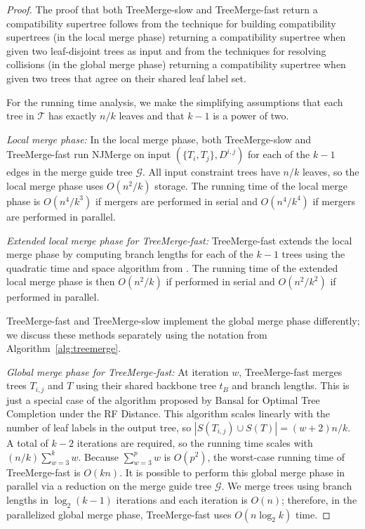 \begin{proof}
The proof that both TreeMerge-slow and TreeMerge-fast return a compatibility supertree follows from the technique for building compatibility supertrees (in the local merge phase) returning a compatibility supertree when given two leaf-disjoint trees as input and from the techniques for resolving collisions (in the global merge phase) returning a compatibility supertree when given two trees that \gls{agree} on their shared leaf label set.

For the running time analysis, we make the simplifying assumptions that each tree in $\mathcal{T}$ has exactly $n/k$ leaves and that $k-1$ is a power of two.

\emph{Local merge phase:} 
In the local merge phase, both TreeMerge-slow and TreeMerge-fast run NJMerge on input $(\{T_i, T_j\}, D^{i,j})$ for each of the $k-1$ edges in the merge guide tree $\mathcal{G}$.
All input constraint trees have $n/k$ leaves, so the local merge phase uses $O(n^2/k)$ storage.
The running time of the local merge phase is $O(n^4/k^3)$ if mergers are performed in serial and $O(n^4/k^4)$ if mergers are performed in parallel.

\emph{Extended local merge phase for TreeMerge-fast:}
TreeMerge-fast extends the local merge phase by computing branch lengths for each of the $k-1$ trees using the quadratic time and space algorithm from \cite{bryant1998rapid}. 
The running time of the extended local merge phase is then $O(n^2/k)$ if performed in serial and $O(n^2/k^2)$ if performed in parallel.

TreeMerge-fast and TreeMerge-slow implement the global merge phase differently; we discuss these methods separately using the notation from Algorithm~\ref{alg:treemerge}.

\emph{Global merge phase for TreeMerge-fast:}
At iteration $w$, TreeMerge-fast merges trees $T_{i,j}$ and $T$ using their shared backbone tree $t_B$ and branch lengths.
This is just a special case of the algorithm proposed by Bansal \cite{bansal2018linear} for Optimal Tree Completion under the \gls{RF} Distance.
This algorithm scales linearly with the number of leaf labels in the output tree, so $|S(T_{i,j}) \cup S(T)| = (w+2)n/k$.
A total of $k-2$ iterations are required, so the running time scales with $(n/k) \sum_{w=3}^k w$.
Because $\sum_{w=3}^p w$ is $O(p^2)$, the worst-case running time of TreeMerge-fast is $O(kn)$.
It is possible to perform this global merge phase in parallel via a reduction on the merge guide tree $\mathcal{G}$.
We merge trees using branch lengths in $\log_2{(k-1)}$ iterations and each iteration is $O(n)$; therefore, in the parallelized global merge
\clearpage
\noindent phase, TreeMerge-fast uses $O(n \log_2{k})$ time.


\end{proof}
